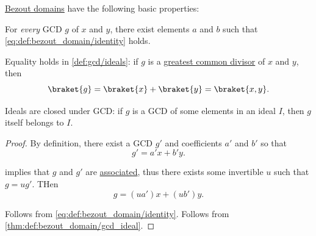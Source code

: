 \begin{proposition}\label{thm:def:bezout_domain}
  \hyperref[def:bezout_domain]{Bezout domains} have the following basic properties:
  \begin{thmenum}
     For \emph{every} GCD \( g \) of \( x \) and \( y \), there exist elements \( a \) and \( b \) such that \eqref{eq:def:bezout_domain/identity} holds.

     Equality holds in \cref{def:gcd/ideals}: if \( g \) is a \hyperref[def:gcd]{greatest common divisor} of \( x \) and \( y \), then
    \begin{equation*}
      \braket{ g } = \braket{ x } + \braket{ y } = \braket{ x, y }.
    \end{equation*}

     Ideals are closed under GCD: if \( g \) is a GCD of some elements in an ideal \( I \), then \( g \) itself belongs to \( I \).
  \end{thmenum}
\end{proposition}
\begin{proof}
   By definition, there exist a GCD \( g' \) and coefficients \( a' \) and \( b' \) so that
  \begin{equation*}
    g' = a'x + b'y.
  \end{equation*}

   implies that \( g \) and \( g' \) are \hyperref[def:domain_divisibility/associates]{associated}, thus there exists some invertible \( u \) such that \( g = ug' \). THen
  \begin{equation*}
    g = (ua')x + (ub')y.
  \end{equation*}

   Follows from \eqref{eq:def:bezout_domain/identity}.
   Follows from \cref{thm:def:bezout_domain/gcd_ideal}.
\end{proof}

